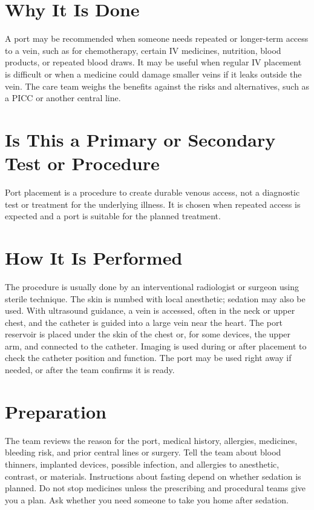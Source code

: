 \section*{Why It Is Done}
A port may be recommended when someone needs repeated or longer-term access to a vein, such as for chemotherapy, certain IV medicines, nutrition, blood products, or repeated blood draws. It may be useful when regular IV placement is difficult or when a medicine could damage smaller veins if it leaks outside the vein. The care team weighs the benefits against the risks and alternatives, such as a PICC or another central line.

\section*{Is This a Primary or Secondary Test or Procedure}
Port placement is a procedure to create durable venous access, not a diagnostic test or treatment for the underlying illness. It is chosen when repeated access is expected and a port is suitable for the planned treatment.

\section*{How It Is Performed}
The procedure is usually done by an interventional radiologist or surgeon using sterile technique. The skin is numbed with local anesthetic; sedation may also be used. With ultrasound guidance, a vein is accessed, often in the neck or upper chest, and the catheter is guided into a large vein near the heart. The port reservoir is placed under the skin of the chest or, for some devices, the upper arm, and connected to the catheter. Imaging is used during or after placement to check the catheter position and function. The port may be used right away if needed, or after the team confirms it is ready.

\section*{Preparation}
The team reviews the reason for the port, medical history, allergies, medicines, bleeding risk, and prior central lines or surgery. Tell the team about blood thinners, implanted devices, possible infection, and allergies to anesthetic, contrast, or materials. Instructions about fasting depend on whether sedation is planned. Do not stop medicines unless the prescribing and procedural teams give you a plan. Ask whether you need someone to take you home after sedation.

